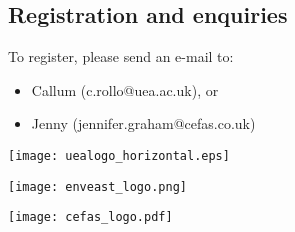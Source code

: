 \documentclass[paper=a4]{scrartcl}
\newcommand*{\pyitem}{\item [{\texttt{[image: python\_logo.png]}}]}
\begin{document}
\subsection*{Registration and enquiries}
To register, please send an e-mail to:
\begin{itemize}
\pyitem Callum (c.rollo@uea.ac.uk), or
\pyitem Jenny (jennifer.graham@cefas.co.uk)
\end{itemize}

\begin{center}
\begin{minipage}{0.2\linewidth}
    \texttt{[image: uealogo\_horizontal.eps]}
\end{minipage}
\hspace{2cm}
\begin{minipage}{0.2\linewidth}
    \texttt{[image: enveast\_logo.png]}
\end{minipage}
\hspace{2cm}
\begin{minipage}{0.2\linewidth}
    \texttt{[image: cefas\_logo.pdf]}
\end{minipage}
\end{center}
\end{document}
